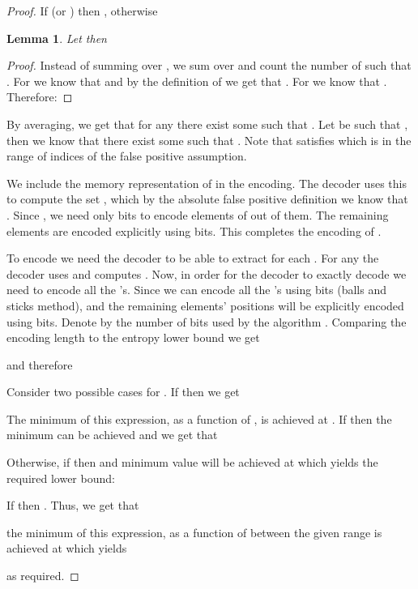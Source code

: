 \documentclass[11pt]{article}
\newtheorem{lemma}[theorem]{Lemma}
\begin{document}
\begin{proof}
If  (or ) then , otherwise 
\begin{lemma}\label{foranyk}
Let  then

\end{lemma}
\begin{proof}
Instead of summing over , we sum over  and count the number of  such that . For  we know that  and by the definition of  we get that . For  we know that . Therefore:


\end{proof}

By averaging, we get that for any  there exist some  such that . Let  be such that , then we know that there exist some  such that . Note that  satisfies  which is in the range of indices of the false positive assumption.

We include the memory representation of  in the encoding. The decoder uses this to compute the set , which by the absolute false positive definition we know that . Since , we need only  bits to encode  elements of  out of them. The remaining  elements are encoded explicitly using  bits. This completes the encoding of .

To encode  we need the decoder to be able to extract  for each . For any  the decoder uses  and computes . Now, in order for the decoder to exactly decode  we need to encode all the 's. Since  we can encode all the 's using  bits (balls and sticks method), and the remaining elements' positions will be explicitly encoded using  bits. Denote by  the number of bits used by the algorithm . Comparing the encoding length to the entropy lower bound we get


and therefore

Consider two possible cases for . If  then we get

The minimum of this expression, as a function of , is achieved at . If  then the minimum can be achieved and we get that

Otherwise, if  then  and minimum value will be achieved at  which yields the required lower bound:

If  then . Thus, we get that


the minimum of this expression, as a function of  between the given range is achieved at  which yields

as required.
\end{proof}
\end{document}
